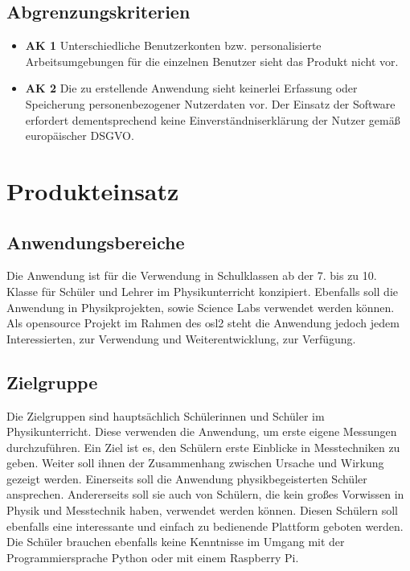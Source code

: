 \documentclass[parskip=full]{scrartcl}
\begin{document}
\subsection{Abgrenzungskriterien}

\begin{itemize}
	
	\item \textbf{AK 1} Unterschiedliche Benutzerkonten bzw. personalisierte Arbeitsumgebungen  für die einzelnen Benutzer sieht das Produkt nicht vor. 
	
	\item \textbf{AK 2} Die zu erstellende Anwendung sieht keinerlei Erfassung oder Speicherung personenbezogener Nutzerdaten vor. Der Einsatz der Software erfordert dementsprechend keine Einverständniserklärung der Nutzer gemäß europäischer \gls{DSGVO}.
	
\end{itemize}

\clearpage
\section{Produkteinsatz}\label{produkteinsatz}

\subsection{Anwendungsbereiche}

Die Anwendung ist für die Verwendung in Schulklassen ab der 7. bis zu 10. Klasse für Schüler und Lehrer im Physikunterricht konzipiert. Ebenfalls soll die Anwendung in Physikprojekten, sowie \gls{Science Labs} verwendet werden können. 
Als \gls{opensource} Projekt im Rahmen des \gls{osl2} steht die Anwendung jedoch jedem Interessierten, zur Verwendung und Weiterentwicklung, zur Verfügung.


\subsection{Zielgruppe}

Die Zielgruppen sind hauptsächlich Schülerinnen und Schüler im Physikunterricht.  Diese verwenden die Anwendung, um erste eigene Messungen durchzuführen. Ein Ziel ist es, den Schülern erste Einblicke in Messtechniken zu geben. Weiter soll ihnen der Zusammenhang zwischen Ursache und Wirkung gezeigt werden. 
Einerseits soll die Anwendung physikbegeisterten Schüler ansprechen. Andererseits soll sie auch von Schülern, die kein großes Vorwissen in Physik und Messtechnik haben, verwendet werden können. Diesen Schülern soll ebenfalls eine interessante und einfach zu bedienende Plattform geboten werden.
Die Schüler brauchen ebenfalls keine Kenntnisse im Umgang mit der Programmiersprache Python oder mit einem Raspberry Pi.
\end{document}
